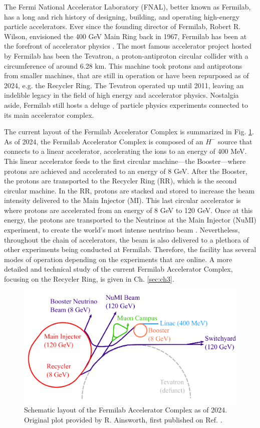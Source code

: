 The Fermi National Accelerator Laboratory (FNAL), better known as Fermilab, has a long and rich history of designing, building, and operating high-energy particle accelerators. Ever since the founding director of Fermilab, Robert R. Wilson, envisioned the 400 GeV Main Ring back in 1967, Fermilab has been at the forefront of accelerator physics \cite{fermilab1,fermi50,tevatron}. The most famous accelerator project hosted by Fermilab has been the Tevatron, a proton-antiproton circular collider with a circumference of around 6.28 km. This machine took protons and antiprotons from smaller machines, that are still in operation or have been repurposed as of 2024, e.g. the Recycler Ring. The Tevatron operated up until 2011, leaving an indelible legacy in the field of high energy and accelerator physics. Nostalgia aside, Fermilab still hosts a deluge of particle physics experiments connected to its main accelerator complex.      

The current layout of the Fermilab Accelerator Complex is summarized in Fig. \ref{fig:fac}. As of 2024, the Fermilab Accelerator Complex is composed of an $H^-$ source that connects to a linear accelerator, accelerating the ions to an energy of 400 MeV. This linear accelerator feeds to the first circular machine---the Booster---where protons are achieved and accelerated to an energy of 8 GeV. After the Booster, the protons are transported to the Recycler Ring (RR), which is the second circular machine. In the RR, protons are stacked and stored to increase the beam intensity delivered to the Main Injector (MI). This last circular accelerator is where protons are accelerated from an energy of 8 GeV to 120 GeV. Once at this energy, the protons are transported to the Neutrinos at the Main Injector (NuMI) experiment, to create the world's most intense neutrino beam \cite{numi1}. Nevertheless, throughout the chain of accelerators, the beam is also delivered to a plethora of other experiments being conducted at Fermilab. Therefore, the facility has several modes of operation depending on the experiments that are online. A more detailed and technical study of the current Fermilab Accelerator Complex, focusing on the Recycler Ring, is given in Ch. \ref{sec:ch3}.   

\begin{figure}[H]
    \centering
    \includegraphics[width=\columnwidth]{chapter1/complex.png}
    \caption{Schematic layout of the Fermilab Accelerator Complex as of 2024. Original plot provided by R. Ainsworth, first published on Ref. \cite{rr1}.}
    \label{fig:fac}
 \end{figure}

